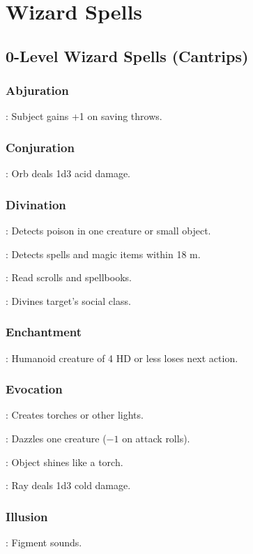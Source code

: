 \section{Wizard Spells}



\subsection{0-Level Wizard Spells (Cantrips)}

\subsubsection{Abjuration}
	: Subject gains +1 on saving throws.

\subsubsection{Conjuration}
	: Orb deals 1d3 acid damage.

\subsubsection{Divination}
	: Detects poison in one creature or small object.

	: Detects spells and magic items within 18 m.

	: Read scrolls and spellbooks.

	: Divines target's social class.

\subsubsection{Enchantment}
	: Humanoid creature of 4 HD or less loses next action.

\subsubsection{Evocation}
	: Creates torches or other lights.

	: Dazzles one creature ($-1$ on attack rolls).

	: Object shines like a torch.

	: Ray deals 1d3 cold damage.

\subsubsection{Illusion}
	: Figment sounds.

